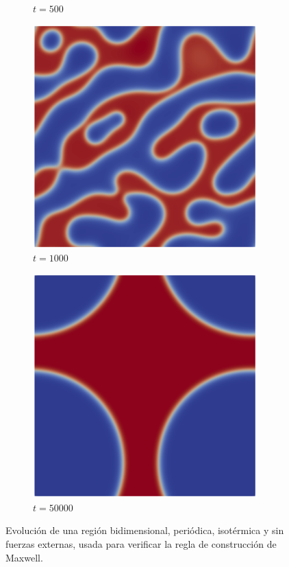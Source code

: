 \begin{figure}[htb]
\begin{subfigure}[t]{0.45\textwidth}
        \caption{$t = 500$}
    \end{subfigure}    
    \begin{subfigure}[t]{0.45\textwidth}
        \centering
        \includegraphics[width=0.95\textwidth]{Imagenes/Maxwell2D/Maxwell2D_sim/Imagenes/t_1000}
        \caption{$t = 1000$}
    \end{subfigure}
    \begin{subfigure}[t]{0.45\textwidth}
        \centering
        \includegraphics[width=0.95\textwidth]{Imagenes/Maxwell2D/Maxwell2D_sim/Imagenes/t_50000}
        \caption{$t = 50000$}
    \end{subfigure}        
    \caption{Evoluci\'on de una regi\'on bidimensional, peri\'odica, isot\'ermica y sin fuerzas externas, usada para verificar la regla de construcci\'on de Maxwell.}
    \label{fig:maxwell_2d}
\end{figure}
\FloatBarrier

